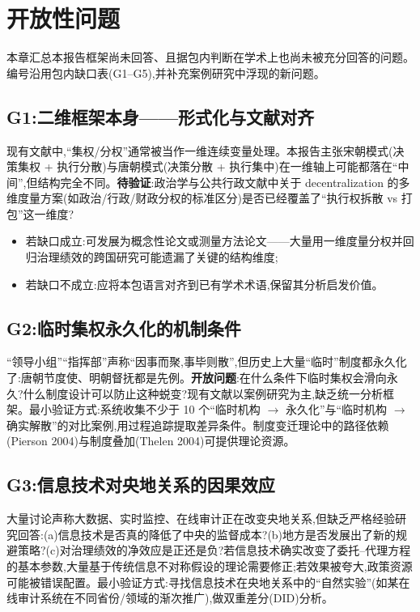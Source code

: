\documentclass[UTF8,12pt,a4paper]{ctexrep}
\begin{document}
\chapter{开放性问题}

本章汇总本报告框架尚未回答、且据包内判断在学术上也尚未被充分回答的问题。编号沿用包内缺口表(G1--G5),并补充案例研究中浮现的新问题。

\section{G1:二维框架本身——形式化与文献对齐}

现有文献中,``集权/分权''通常被当作一维连续变量处理。本报告主张宋朝模式(决策集权 + 执行分散)与唐朝模式(决策分散 + 执行集中)在一维轴上可能都落在``中间'',但结构完全不同。\textbf{待验证}:政治学与公共行政文献中关于 decentralization 的多维度量方案(如政治/行政/财政分权的标准区分)是否已经覆盖了``执行权拆散 vs 打包''这一维度?

\begin{itemize}
  \item 若缺口成立:可发展为概念性论文或测量方法论文——大量用一维度量分权并回归治理绩效的跨国研究可能遗漏了关键的结构维度;
  \item 若缺口不成立:应将本包语言对齐到已有学术术语,保留其分析启发价值。
\end{itemize}

\section{G2:临时集权永久化的机制条件}

``领导小组''``指挥部''声称``因事而聚,事毕则散'',但历史上大量``临时''制度都永久化了:唐朝节度使、明朝督抚都是先例。\textbf{开放问题}:在什么条件下临时集权会滑向永久?什么制度设计可以防止这种蜕变?现有文献以案例研究为主,缺乏统一分析框架。最小验证方式:系统收集不少于 10 个``临时机构 $\rightarrow$ 永久化''与``临时机构 $\rightarrow$ 确实解散''的对比案例,用过程追踪提取差异条件。制度变迁理论中的路径依赖(Pierson 2004)与制度叠加(Thelen 2004)可提供理论资源。

\section{G3:信息技术对央地关系的因果效应}

大量讨论声称大数据、实时监控、在线审计正在改变央地关系,但缺乏严格经验研究回答:(a)信息技术是否真的降低了中央的监督成本?(b)地方是否发展出了新的规避策略?(c)对治理绩效的净效应是正还是负?若信息技术确实改变了委托--代理方程的基本参数,大量基于传统信息不对称假设的理论需要修正;若效果被夸大,政策资源可能被错误配置。最小验证方式:寻找信息技术在央地关系中的``自然实验''(如某在线审计系统在不同省份/领域的渐次推广),做双重差分(DID)分析。
\end{document}
